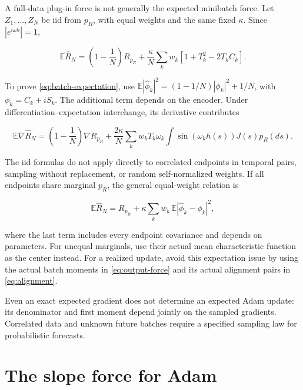 \documentclass[11pt]{article}
\begin{document}
A full-data plug-in force is not generally the expected minibatch force.
Let \(Z_1,\ldots,Z_N\) be iid from \(p_R\), with equal weights and the
same fixed \(\kappa\). Since \(|e^{i\omega h}|=1\),

\begin{equation}\label{eq:batch-expectation}
\mathbb E\widehat R_N
=\left(1-\frac1N\right)R_{p_R}
+\frac\kappa N\sum_k w_k[1+T_k^2-2T_k C_k].
\end{equation}

\begin{samepage}
To prove \eqref{eq:batch-expectation}, use
\(\mathbb E|\widehat\phi_k|^2=(1-1/N)|\phi_k|^2+1/N\), with
\(\phi_k=C_k+iS_k\). The additional term depends on the encoder. Under
differentiation--expectation interchange, its derivative contributes

\begin{equation}\label{eq:batch-gradient}
\mathbb E\nabla\widehat R_N
=\left(1-\frac1N\right)\nabla R_{p_R}
+\frac{2\kappa}{N}\sum_k w_kT_k\omega_k
\int\sin(\omega_kh(s))J(s)p_R(ds).
\end{equation}
\end{samepage}

The iid formulas do not apply directly to correlated endpoints in
temporal pairs, sampling without replacement, or random self-normalized
weights. If all endpoints share marginal \(p_R\), the general
equal-weight relation is

\begin{equation}\label{eq:correlated-batch}
\mathbb E\widehat R_N=R_{p_R}
+\kappa\sum_k w_k\,\mathbb E|\widehat\phi_k-\phi_k|^2,
\end{equation}

where the last term includes every endpoint covariance and depends on
parameters. For unequal marginals, use their actual mean characteristic
function as the center instead. For a realized update, avoid this
expectation issue by using the actual batch moments in \eqref{eq:output-force} and its
actual alignment pairs in \eqref{eq:alignment}.

Even an exact expected gradient does not determine an expected Adam
update: its denominator and first moment depend jointly on the sampled
gradients. Correlated data and unknown future batches require a
specified sampling law for probabilistic forecasts.

\section{The slope force for Adam}\label{the-slope-force-for-adam}
\end{document}
